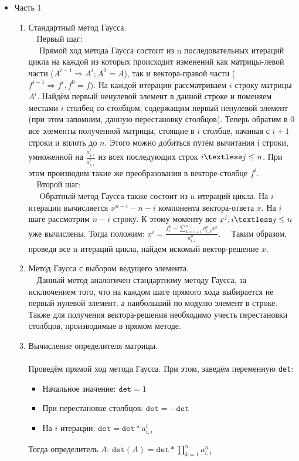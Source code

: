 \documentclass[a4paper,12pt,titlepage,finall]{article}
\newcommand{\lt}{\textless}       %
\begin{document}
\begin{itemize}
\item Часть 1\\
\begin{enumerate}
\item Стандартный метод Гаусса.\\


$\quad$Первый шаг: \\ 
$\quad$ Прямой ход метода Гаусса состоит из n последовательных итераций цикла на каждой из которых происходит изменений как матрицы-левой части ($A^{i-1}\Rightarrow{}A^{i}; A^{0}=A$), так и вектора-правой части (${f}^{i-1}\Rightarrow{}{f}^{i},{f}^0={f}$). На каждой итерации рассматриваем $i$ строку матрицы $A^{i}$. Найдём первый ненулевой элемент в данной строке и поменяем местами $i$ столбец со столбцом, содержащим первый ненулевой элемент (при этом запомним, данную перестановку столбцов). Теперь обратим в $0$ все элементы полученной матрицы, стоящие в $i$ столбце, начиная с $i+1$ строки и вплоть до $n$. Этого можно добиться путём вычитания i строки, умноженной на $\frac{a_{j,i}^{i}}{a_{i,i}^{i}}$ из всех последующих строк $i \lt j \leq n$. При этом производим такие же преобразования в векторе-столбце ${f}^{i}$.\\

$\quad$Второй шаг: \\ 
$\quad$ Oбратный метод Гаусса также состоит из n итераций цикла. На $i$ итерации вычисляется $x^{n-i}$ – $n-i$ компонента вектора-ответа ${x}$. На $i$ шаге рассмотрим $n-i$ строку. К этому моменту все $x^{j}, i \lt j \leq n$ уже вычислены. Тогда положим: $x^{i}=\frac{{f}^{n}_{i} - \sum\limits_{k=i+1}^{n} a^{n}_{i,k}x^{k}}{a^{n}_{i,i}}.$
$\quad$Таким образом, проведя все n итераций цикла, найдем искомый вектор-решение ${x}$.\\

\item Метод Гаусса с выбором ведущего элемента.\\

$\quad$Данный метод аналогичен стандартному методу Гаусса, за исключением того, что на каждом шаге прямого хода выбирается не первый нулевой элемент, а наибольший по модулю элемент в строке. Также для получения вектора-решения необходимо учесть перестановки столбцов, производимые в прямом методе.
~\\

\item Вычисление определителя матрицы.\\
~\\
Проведём прямой ход метода Гаусса. При этом, заведём переменную \texttt{det}:
\begin{itemize}
\item Начальное значение: $\texttt{det} = 1$
\item 	При перестановке столбцов: $\texttt{det}= - \texttt{det}$
\item 	На $i$ итерации: $\texttt{det}=\texttt{det} * a^{i}_{i,i}$
\end{itemize}
Тогда определитель $A$: $\texttt{det}(A)=\texttt{det}*\prod\limits_{k=1}^{n} a^{n}_{i,i}$


\end{enumerate}
\end{itemize}
\end{document}
